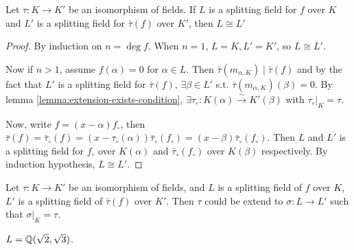 \begin{theorem} \label{thm:two-splitting-field-are-isom}
  Let $\tau: K \to K'$ be an isomorphism of fields.
  If $L$ is a splitting field for $f$ over $K$ and $L'$ is a splitting field for $\bar\tau(f)$
  over $K'$, then $L \cong L'$

\begin{proof} \label{coro:extension-exists-splitting-field}
  By induction on $n = \deg f$. When $n = 1$, $L = K, L' = K'$, so $L \cong L'$.

  Now if $n > 1$, assume $f(\alpha) = 0$ for $\alpha \in L$. Then $\bar\tau(m_{\alpha, K}) \mid \bar\tau(f)$
  and by the fact that $L'$ is a splitting field for $\bar\tau(f)$, $\exists \beta \in L'$ s.t. $\bar\tau(m_{\alpha, K})(\beta) = 0$.
  By lemma \ref{lemma:extension-exists-condition}, $\exists \tau_{\circ}:
  K(\alpha) \xrightarrow\sim K'(\beta)$ with $\tau_\circ \big|_K = \tau$.

  Now, write $f = (x - \alpha) f_\circ$, then $\bar\tau(f) = \bar\tau_\circ(f) = (x - \tau_\circ(\alpha))
  \bar\tau_\circ(f_\circ) = (x - \beta) \bar\tau_\circ(f_\circ)$. Then $L$ and $L'$ is a splitting
  field for $f_{\circ}$ over $K(\alpha)$ and $\bar\tau_\circ(f_\circ)$ over $K(\beta)$ respectively.
  By induction hypothesis, $L \cong L'$.
\end{proof}
\end{theorem}

\begin{coro}
  Let $\tau: K \to K'$ be an isomorphism of fields, and
  $L$ is a splitting field of $f$ over $K$, $L'$ is a splitting field of $\bar\tau(f)$ over $K'$.
  Then $\tau$ could be extend to $\sigma: L \to L'$ such that $\sigma\big|_K = \tau$.
\end{coro}

\begin{example}
  $L = \mathbb{Q}(\sqrt{2}, \sqrt{3})$.
\end{example}
